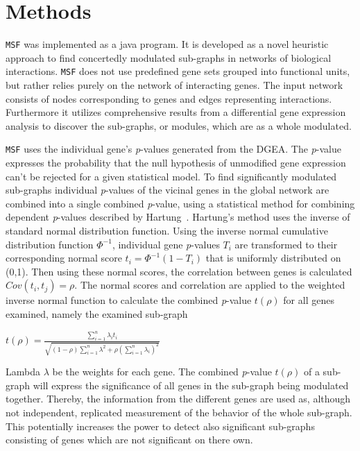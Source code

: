 \documentclass[10pt,a4paper,twocolumn]{article}
\begin{document}
\section*{Methods}

\texttt{MSF} was implemented as a java program. It is developed as a novel heuristic approach to find concertedly
modulated sub-graphs in networks of biological interactions.  \texttt{MSF}
does not use predefined gene sets grouped into functional units, but rather
relies purely on the network of interacting genes. The input network
consists of nodes corresponding to genes and edges representing
interactions. Furthermore it utilizes comprehensive results from a
differential gene expression analysis to discover the sub-graphs, or
modules, which are as a whole modulated.

\texttt{MSF} uses the individual gene's \textit{p}-values generated from
the DGEA. The \textit{p}-value expresses the probability that the null
hypothesis of unmodified gene expression can't be rejected for a given
statistical model. To find significantly modulated sub-graphs individual
\textit{p}-values of the vicinal genes in the global network are combined
into a single combined \textit{p}-value, using a statistical method for
combining dependent \textit{p}-values described by
Hartung~\cite{Hartung}. Hartung's method uses the inverse of standard
normal distribution function. Using the inverse normal cumulative distribution function $\Phi^{-1}$, individual gene \textit{p}-values $T_{i}$ are 
transformed to their corresponding normal score $t_{i}=\Phi^{-1}(1-T_{i})$ that is uniformly distributed on (0,1). Then using these normal
scores, the correlation between genes is calculated $Cov(t_{i},t_{j})=\rho$. The normal scores and
correlation are applied to the weighted inverse normal function to calculate the
combined \textit{p}-value $t(\rho)$ for all genes examined, namely the examined
sub-graph
\newline
 \begin{center}
 	$t(\rho)=\frac{\sum_{i=1}^{n}\lambda_i t_{i} }{\sqrt{(1-\rho) \sum_{i=1}^{n} \lambda^{2}+\rho(\sum_{i=1}^{n} \lambda_i)^{2}}}$
 \end{center}
 
  Lambda $\lambda$ be the weights for each gene. The combined \textit{p}-value  $t(\rho)$ of a sub-graph will express the
significance of all genes in the sub-graph being modulated
together. Thereby, the information from the different genes are used as,
although not independent, replicated measurement of the behavior of the
whole sub-graph. This potentially increases the power to detect also
significant sub-graphs consisting of genes which are not significant on
there own.
\newline
\end{document}
